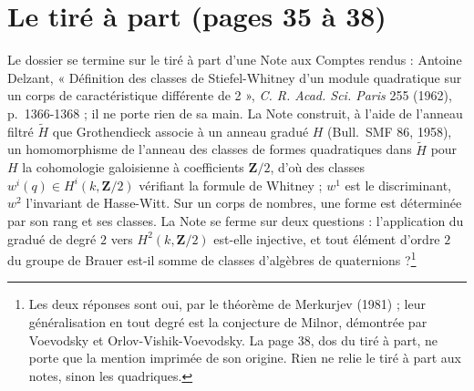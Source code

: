 \documentclass[11pt,a4paper]{article}
\begin{document}
\section*{Le tiré à part (pages 35 à 38)}

Le dossier se termine sur le tiré à part d'une Note aux Comptes rendus :
Antoine Delzant, « Définition des classes de Stiefel-Whitney d'un module
quadratique sur un corps de caractéristique différente de 2 »,
\emph{C. R. Acad. Sci. Paris} 255 (1962), p.~1366-1368 ; il ne porte rien
de sa main. La Note construit, à l'aide de l'anneau filtré
$\widetilde{H}$ que Grothendieck associe à un anneau gradué $H$ (Bull.\ SMF
86, 1958), un homomorphisme de l'anneau des classes de formes
quadratiques dans $\widetilde{H}$ pour $H$ la cohomologie galoisienne à
coefficients $\mathbf{Z}/2$, d'où des classes
$w^{i}(q) \in H^{i}(k, \mathbf{Z}/2)$ vérifiant la formule de Whitney ;
$w^{1}$ est le discriminant, $w^{2}$ l'invariant de Hasse-Witt. Sur un corps
de nombres, une forme est déterminée par son rang et ses classes. La Note
se ferme sur deux questions : l'application du gradué de degré $2$ vers
$H^{2}(k, \mathbf{Z}/2)$ est-elle injective, et tout élément d'ordre $2$
du groupe de Brauer est-il somme de classes d'algèbres de quaternions
?\footnote{Les deux réponses sont oui, par le théorème de Merkurjev
(1981) ; leur généralisation en tout degré est la conjecture de Milnor,
démontrée par Voevodsky et Orlov-Vishik-Voevodsky. La page 38, dos du
tiré à part, ne porte que la mention imprimée de son origine. Rien ne
relie le tiré à part aux notes, sinon les quadriques.}
\end{document}
